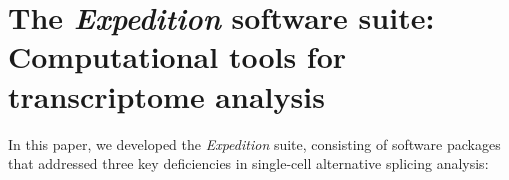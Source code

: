 \chapter{The \emph{Expedition} software suite: Computational tools for transcriptome analysis}



In this paper, we developed the \emph{Expedition} suite, consisting of  software packages that addressed three key deficiencies in single-cell alternative splicing analysis:

